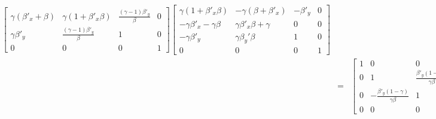 \documentclass[11pt]{amsart}
\begin{document}
\begin{eqnarray*}
\begin{bmatrix}
	\gamma(\beta'_{x}+\beta) & \gamma(1+\beta'_{x}\beta) & \frac{(\gamma-1)\beta'_{y}}{\beta} & 0  \\
	 \gamma\beta'_{y} & \frac{(\gamma-1)\beta'_{y}}{\beta} & 1 & 0 \\
0 & 0 & 0 & 1 
\end{bmatrix}\begin{bmatrix}
	\gamma(1+\beta'_{x}\beta) &-\gamma(\beta+\beta'_{x}) & -\beta'_{y} & 0 \\
	-\gamma\beta'_{x}-\gamma\beta & \gamma\beta'_{x}\beta+\gamma & 0 & 0  \\
	-\gamma\beta'_{y} & \gamma\beta_{y}'\beta & 1 & 0 \\
	0 & 0 & 0 & 1 
	\end{bmatrix} \\
&=& \begin{bmatrix}
	1 & 0 & 0 & 0 \\
	0 & 1 & \frac{\beta'_{y}(1-\gamma)}{\gamma\beta} & 0 \\
	0 & -\frac{\beta'_{y}(1-\gamma)}{\gamma\beta} & 1 & 0 \\
	0 & 0 & 0 & 1
	\end{bmatrix} 
\end{eqnarray*} \\
\end{document}
